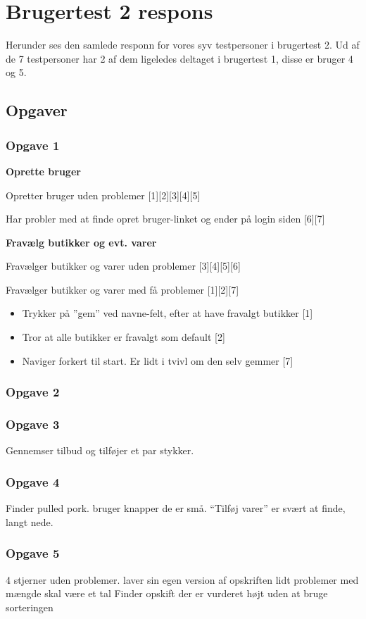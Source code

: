 \chapter{Brugertest 2 respons}\label{b:brugertestrespons2}
Herunder ses den samlede responn for vores syv testpersoner i brugertest 2.
Ud af de 7 testpersoner har 2 af dem ligeledes deltaget i brugertest 1, disse er bruger 4 og 5.

\section{Opgaver}
\subsection{Opgave 1}
\textbf{Oprette bruger}

Opretter bruger uden problemer [1][2][3][4][5]

Har probler med at finde opret bruger-linket og ender på login siden [6][7]

\textbf{Fravælg butikker og evt. varer}

Fravælger butikker og varer uden problemer [3][4][5][6]

Fravælger butikker og varer med få problemer [1][2][7]
\begin{itemize}
	\item Trykker på ''gem'' ved navne-felt, efter at have fravalgt butikker [1]
	\item Tror at alle butikker er fravalgt som default [2]
	\item Naviger forkert til start. Er lidt i tvivl om den selv gemmer [7]
\end{itemize}

\subsection{Opgave 2}


\subsection{Opgave 3} 
Gennemser tilbud og tilføjer et par stykker.

\subsection{Opgave 4}
Finder pulled pork. bruger knapper de er små.
“Tilføj varer” er svært at finde, langt nede.

\subsection{Opgave 5}
4 stjerner uden problemer.
laver sin egen version af opskriften
lidt problemer med mængde skal være et tal
Finder opskift der er vurderet højt uden at bruge sorteringen

